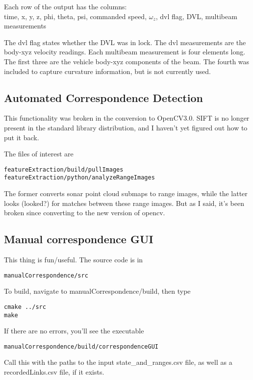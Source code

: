 \documentclass[12pt]{amsart}
\begin{document}
Each row of the output has the columns:\\
time, x, y, z, phi, theta, psi, commanded speed, $\omega_z$, dvl flag, DVL, multibeam measurements

The dvl flag states whether the DVL was in lock. The dvl measurements are the body-xyz velocity readings. Each multibeam measurement is four elements long. The first three are the vehicle body-xyz components of the beam. The fourth was included to capture curvature information, but is not currently used.

\subsection{Automated Correspondence Detection}


This functionality was broken in the conversion to OpenCV3.0. SIFT is no longer present in the standard library distribution, and I haven't yet figured out how to put it back. 

The files of interest are
\begin{lstlisting}
featureExtraction/build/pullImages
featureExtraction/python/analyzeRangeImages
\end{lstlisting}

The former converts sonar point cloud submaps to range images, while the latter looks (looked?) for matches between these range images. But as I said, it's been broken since converting to the new version of opencv.

\subsection{Manual correspondence GUI}

This thing is fun/useful. The source code is in 
\begin{lstlisting}
manualCorrespondence/src
\end{lstlisting}

To build, navigate to manualCorrespondence/build, then type 

\begin{lstlisting}
cmake ../src
make
\end{lstlisting}

If there are no errors, you'll see the executable 
\begin{lstlisting}
manualCorrespondence/build/correspondenceGUI
\end{lstlisting}

Call this with the paths to the input state\_and\_ranges.csv file, as well as a recordedLinks.csv file, if it exists.
\end{document}
